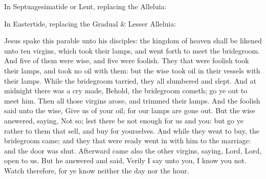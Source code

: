 \begin{rubric}
{In Septuagesimatide or Lent, replacing the Alleluia:}
\end{rubric}

\vspace{-1ex}


\begin{rubric}
{In Eastertide, replacing the Gradual \& Lesser Alleluia:}
\end{rubric}

\vspace{-1ex}


\label{CommonVirginOnlyIGospel}
 Jesus spake this parable unto his disciples: the kingdom of heaven shall be likened unto ten virgins, which took their lamps, and went forth to meet the bridegroom. And five of them were wise, and five were foolish. They that were foolish took their lamps, and took no oil with them: but the wise took oil in their vessels with their lamps. While the bridegroom tarried, they all slumbered and slept. And at midnight there was a cry made, Behold, the bridegroom cometh; go ye out to meet him. Then all those virgins arose, and trimmed their lamps. And the foolish said unto the wise, Give us of your oil; for our lamps are gone out. But the wise answered, saying, Not so; lest there be not enough for us and you: but go ye rather to them that sell, and buy for yourselves. And while they went to buy, the bridegroom came; and they that were ready went in with him to the marriage: and the door was shut. Afterward came also the other virgins, saying, Lord, Lord, open to us. But he answered and said, Verily I say unto you, I know you not. Watch therefore, for ye know neither the day nor the hour.

